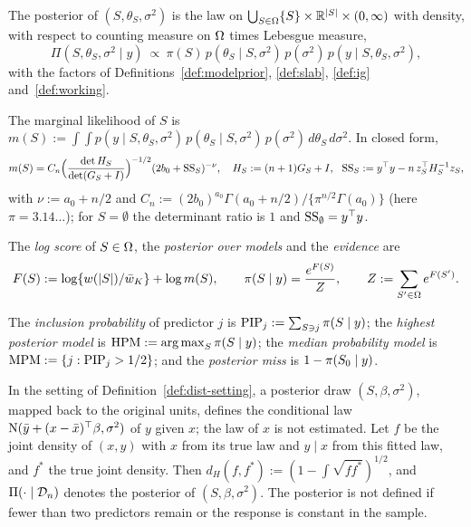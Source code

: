 \begin{definition}\label{def:jointpost}
The posterior of $(S,\theta_S,\sigma^2)$ is the law on $\bigcup_{S\in\Omega}\{S\}\times\mathbb{R}^{\lvert S\rvert}\times(0,\infty)$ with
density, with respect to counting measure on $\Omega$ times Lebesgue measure,
\[
  \Pi(S,\theta_S,\sigma^2\mid y)\ \propto\ \pi(S)\,p(\theta_S\mid S,\sigma^2)\,p(\sigma^2)\,p(y\mid S,\theta_S,\sigma^2),
\]
with the factors of Definitions~\ref{def:modelprior}, \ref{def:slab}, \ref{def:ig} and~\ref{def:working}.
\end{definition}

\begin{definition}\label{def:marglik}
The marginal likelihood of $S$ is $m(S):=\int\!\!\int p(y\mid S,\theta_S,\sigma^2)\,p(\theta_S\mid S,\sigma^2)\,p(\sigma^2)
\,d\theta_S\,d\sigma^2$. In closed form,
\begin{equation}\label{eq:marglik}
  m(S)=C_n\Big(\frac{\det H_S}{\det(G_S+I)}\Big)^{-1/2}(2b_0+\mathrm{SS}_S)^{-\nu},\quad
  H_S:=(n+1)G_S+I,\ \ \mathrm{SS}_S:=y^\top y-n\,z_S^\top H_S^{-1}z_S,
\end{equation}
with $\nu:=a_0+n/2$ and $C_n:=(2b_0)^{a_0}\Gamma(a_0+n/2)/\{\pi^{n/2}\Gamma(a_0)\}$ (here $\pi=3.14\ldots$); for
$S=\emptyset$ the determinant ratio is $1$ and $\mathrm{SS}_\emptyset=y^\top y$.
\end{definition}

\begin{definition}\label{def:posterior}
The \emph{log score} of $S\in\Omega$, the \emph{posterior over models} and the \emph{evidence} are
\begin{equation}\label{eq:posterior}
  F(S):=\log\{w(\lvert S\rvert)/\bar w_K\}+\log m(S),\qquad \pi(S\mid y)=\frac{e^{F(S)}}{Z},\qquad Z:=\sum_{S'\in\Omega}e^{F(S')} .
\end{equation}
\end{definition}

\begin{definition}\label{def:summaries}
The \emph{inclusion probability} of predictor $j$ is $\mathrm{PIP}_j:=\sum_{S\ni j}\pi(S\mid y)$; the \emph{highest posterior model} is
$\mathrm{HPM}:=\operatorname*{arg\,max}_S\pi(S\mid y)$; the \emph{median probability model} is $\mathrm{MPM}:=\{j:\mathrm{PIP}_j>1/2\}$; and the \emph{posterior miss}
is $1-\pi(S_0\mid y)$.
\end{definition}

\begin{definition}\label{def:hellinger}
In the setting of Definition~\ref{def:dist-setting}, a posterior draw $(S,\beta,\sigma^2)$, mapped back to the original
units, defines the conditional law $\mathrm{N}(\bar y+(x-\bar x)^\top\beta,\sigma^2)$ of $y$ given $x$; the law of $x$ is not
estimated. Let $f$ be the joint density of $(x,y)$ with $x$ from its true law and $y\mid x$ from this fitted law, and $f^*$
the true joint density. Then $d_H(f,f^*):=(1-\int\sqrt{ff^*})^{1/2}$, and $\Pi(\cdot\mid\mathcal D_n)$ denotes the posterior of
$(S,\beta,\sigma^2)$. The posterior is not defined if fewer than two predictors remain or the response is constant in the
sample.
\end{definition}

